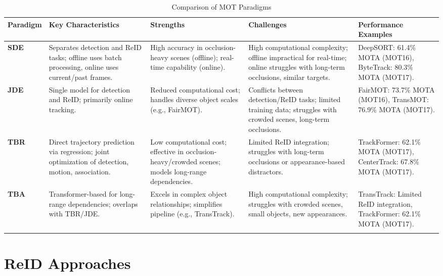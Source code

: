 \documentclass[12pt, a4paper]{article}
\begin{document}
\begin{table}[H]
\centering
\caption{Comparison of MOT Paradigms}
\begin{tabular}{|>{\raggedright\arraybackslash}m{2cm}|>{\raggedright\arraybackslash}m{4cm}|>{\raggedright\arraybackslash}m{3.5cm}|>{\raggedright\arraybackslash}m{4.5cm}|>{\raggedright\arraybackslash}m{3.5cm}|}
\hline
\textbf{Paradigm} & \textbf{Key Characteristics} & \textbf{Strengths} & \textbf{Challenges} & \textbf{Performance Examples} \\
\hline
\textbf{SDE} & Separates detection and ReID tasks; offline uses batch processing, online uses current/past frames. & High accuracy in occlusion-heavy scenes (offline); real-time capability (online). & High computational complexity; offline impractical for real-time; online struggles with long-term occlusions, similar targets. & DeepSORT: 61.4\% MOTA (MOT16), ByteTrack: 80.3\% MOTA (MOT17). \\
\hline
\textbf{JDE} & Single model for detection and ReID; primarily online tracking. & Reduced computational cost; handles diverse object scales (e.g., FairMOT). & Conflicts between detection/ReID tasks; limited training data; struggles with crowded scenes, long-term occlusions. & FairMOT: 73.7\% MOTA (MOT16), TransMOT: 76.9\% MOTA (MOT17). \\
\hline
\textbf{TBR} & Direct trajectory prediction via regression; joint optimization of detection, motion, association. & Low computational cost; effective in occlusion-heavy/crowded scenes; models long-range dependencies. & Limited ReID integration; struggles with long-term occlusions or appearance-based distractors. & TrackFormer: 62.1\% MOTA (MOT17), CenterTrack: 67.8\% MOTA (MOT17). \\
\hline
\textbf{TBA} & Transformer-based for long-range dependencies; overlaps with TBR/JDE. & Excels in complex object relationships; simplifies pipeline (e.g., TransTrack). & High computational complexity; struggles with crowded scenes, small objects, new appearances. & TransTrack: Limited ReID integration, TrackFormer: 62.1\% MOTA (MOT17). \\
\hline
\label{MOT_paradigms_table}
\end{tabular}
\end{table}

\section{ReID Approaches}
\end{document}
